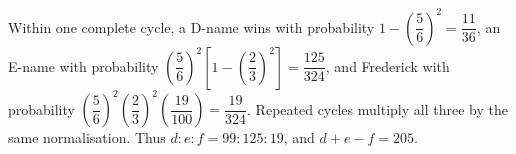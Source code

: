Within one complete cycle, a D-name wins with probability $1-(\dfrac{5}{6})^2=\dfrac{11}{36}$, an E-name with probability $(\dfrac{5}{6})^2[1-(\dfrac{2}{3})^2]=\dfrac{125}{324}$, and Frederick with probability $(\dfrac{5}{6})^2(\dfrac{2}{3})^2(\dfrac{19}{100})=\dfrac{19}{324}$. Repeated cycles multiply all three by the same normalisation. Thus $d:e:f=99:125:19$, and $d+e-f=\boxed{205}$.
